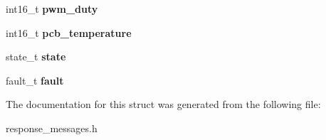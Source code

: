 \begin{DoxyCompactItemize}
\item 
\mbox{\label{structControlResponse_abeb5c1b5e5fed33dcfb6595b06ad8d1b}} 
int16\+\_\+t {\bfseries pwm\+\_\+duty}
\item 
\mbox{\label{structControlResponse_ad11ecc5814970e9b7a3f0d9471d07ae1}} 
int16\+\_\+t {\bfseries pcb\+\_\+temperature}
\item 
\mbox{\label{structControlResponse_af726a4b6a342d214b606a048ed070989}} 
state\+\_\+t {\bfseries state}
\item 
\mbox{\label{structControlResponse_a73672473e86060a346b0d55d3c1ac62d}} 
fault\+\_\+t {\bfseries fault}
\end{DoxyCompactItemize}


The documentation for this struct was generated from the following file\+:\begin{DoxyCompactItemize}
\item 
response\+\_\+messages.\+h\end{DoxyCompactItemize}
